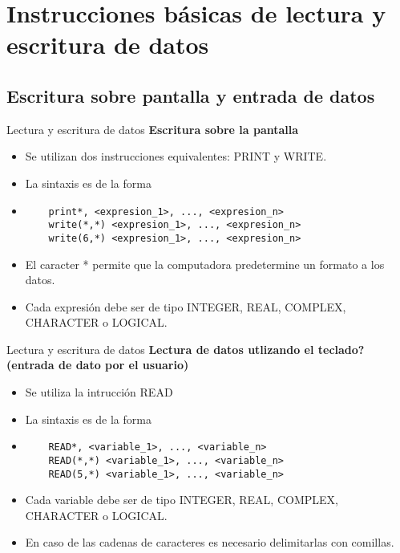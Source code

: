 
\section{Instrucciones básicas de lectura y escritura de datos}  


\subsection{Escritura sobre pantalla y entrada de datos}

\begin{frame}[fragile]{Lectura y escritura de datos}
\textbf{Escritura sobre la pantalla}
 \begin{itemize}[<+(1)->]
  \item Se utilizan dos instrucciones equivalentes: PRINT y WRITE.
  \item La sintaxis es de la forma 
  \item []
   \begin{verbatim}
    print*, <expresion_1>, ..., <expresion_n>
    write(*,*) <expresion_1>, ..., <expresion_n>
    write(6,*) <expresion_1>, ..., <expresion_n>
   \end{verbatim}
  \item El caracter * permite que la computadora predetermine un formato a los datos.
  \item Cada expresión debe ser de tipo INTEGER, REAL, COMPLEX, CHARACTER o LOGICAL.
 \end{itemize}
\end{frame}

\begin{frame}[fragile]{Lectura y escritura de datos}
 \textbf{Lectura de datos utlizando el teclado? (entrada de dato por el usuario) }
 \begin{itemize}[<+(1)->]
  \item Se utiliza la intrucción READ
  \item La sintaxis es de la forma
  \vspace{0.2cm}
  \item []
   \begin{verbatim}
    READ*, <variable_1>, ..., <variable_n>
    READ(*,*) <variable_1>, ..., <variable_n>
    READ(5,*) <variable_1>, ..., <variable_n>
   \end{verbatim}
  \item Cada variable debe ser de tipo INTEGER, REAL, COMPLEX, CHARACTER o LOGICAL. 
  \item En caso de las cadenas de caracteres es necesario delimitarlas con comillas.
 \end{itemize}
\end{frame}

